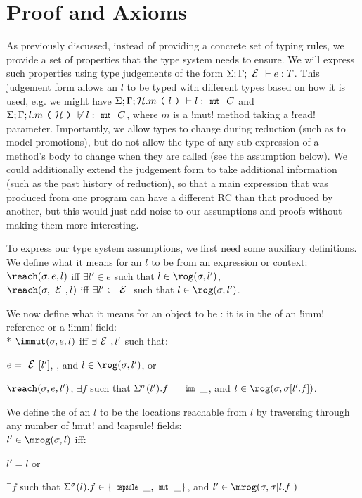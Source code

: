 \section{Proof and Axioms}
\label{s:proof}

As previously discussed, instead of providing a concrete set of typing rules, we provide a set of properties that the type system needs to ensure.
We will express such properties using type judgements of the form $\ty{e}{T}$. This judgement form allows an $l$ to be typed with different types based on how it is used, e.g. we might have $\S;\G;\h.m\oR l \cR \vdash l : \Kw{mut}\ C$  and $\S;\G;l.m\oR \h \cR \nvdash l : \Kw{mut}\ C$, where $m$ is a \Q!mut! method taking a \Q!read! parameter. Importantly, we allow types to change during reduction (such as to model promotions), but do not allow the type of any sub-expression of a method's body to change when they are called (see the  assumption below). We could additionally extend the judgement form to take additional information (such as the past history of reduction), so that a main expression that was produced from one program can have a different RC than that produced by another, but this would just add noise to our assumptions and proofs without making them more interesting.

To express our type system assumptions, we first need some auxiliary definitions. We define what it means for an $l$ to be \reach from an expression or context:\\
\indent $\reach(\s, e, l)$ iff $\exists l' \in e$ such that $l \in \rog(\s, l')$,\\
\indent $\reach(\s, \E, l)$ iff $\exists l' \in \E$ such that $l \in \rog(\s, l')$.

\noindent We now define what it means for an object to be \immut: it is in the \rog of an \Q!imm! reference or a \reach \Q!imm! field:\\*
\indent $\immut(\s, e, l)$ iff $\exists \E, l'$ such that:
\begin{iitemize}
\item $e = \E[l']$, , and $l \in \rog(\s, l')$, or
\item $\reach(\s, e, l')$, $\exists f$ such that $\Ss(l').f = \Kw{imm}\,\_$, and $l \in \rog(\s, \s[l'.f])$.
\end{iitemize}

\noindent We define the \mrog of an $l$ to be the locations reachable from $l$ by traversing through any number of \Q!mut! and \Q!capsule! fields:\\
\indent $l' \in \mrog(\s, l)$ iff:%
\begin{iitemize}
	\item $l' = l$ or
	\item $\exists f$ such that $\Ss(l).f \in \{\Kw{capsule}\,\_, \Kw{mut}\,\_\}$, and $l' \in \mrog(\s, \s[l.f])$
\end{iitemize}

